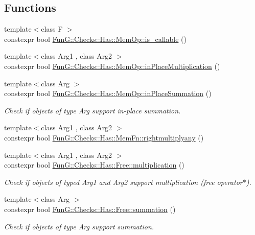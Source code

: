 \subsection*{Functions}
\begin{DoxyCompactItemize}
\item 
{\footnotesize template$<$class F $>$ }\\constexpr bool \hyperlink{namespaceFunG_1_1Checks_1_1Has_1_1MemOp_a5810c07eff37faaf76b881548a6722bd}{Fun\-G\-::\-Checks\-::\-Has\-::\-Mem\-Op\-::is\-\_\-callable} ()
\item 
{\footnotesize template$<$class Arg1 , class Arg2 $>$ }\\constexpr bool \hyperlink{namespaceFunG_1_1Checks_1_1Has_1_1MemOp_ae8e502928ebc6342cab98ebbb62b8802}{Fun\-G\-::\-Checks\-::\-Has\-::\-Mem\-Op\-::in\-Place\-Multiplication} ()
\item 
{\footnotesize template$<$class Arg $>$ }\\constexpr bool \hyperlink{namespaceFunG_1_1Checks_1_1Has_1_1MemOp_a23052f7d8da399943f6354a7d477c825}{Fun\-G\-::\-Checks\-::\-Has\-::\-Mem\-Op\-::in\-Place\-Summation} ()
\begin{DoxyCompactList}\small\item\em Check if objects of type Arg support in-\/place summation. \end{DoxyCompactList}\item 
{\footnotesize template$<$class Arg1 , class Arg2 $>$ }\\constexpr bool \hyperlink{namespaceFunG_1_1Checks_1_1Has_1_1MemFn_adeb3d401c6464514644930596c3a4ccc}{Fun\-G\-::\-Checks\-::\-Has\-::\-Mem\-Fn\-::rightmultiplyany} ()
\item 
{\footnotesize template$<$class Arg1 , class Arg2 $>$ }\\constexpr bool \hyperlink{namespaceFunG_1_1Checks_1_1Has_1_1Free_a2454bd1f5873cc86ec31d09d822a67b1}{Fun\-G\-::\-Checks\-::\-Has\-::\-Free\-::multiplication} ()
\begin{DoxyCompactList}\small\item\em Check if objects of typed Arg1 and Arg2 support multiplication (free operator$\ast$). \end{DoxyCompactList}\item 
{\footnotesize template$<$class Arg $>$ }\\constexpr bool \hyperlink{namespaceFunG_1_1Checks_1_1Has_1_1Free_a1cf46f7335354d21dff506aaf812b4f5}{Fun\-G\-::\-Checks\-::\-Has\-::\-Free\-::summation} ()
\begin{DoxyCompactList}\small\item\em Check if objects of type Arg support summation. \end{DoxyCompactList}\item 

\end{DoxyCompactItemize}
